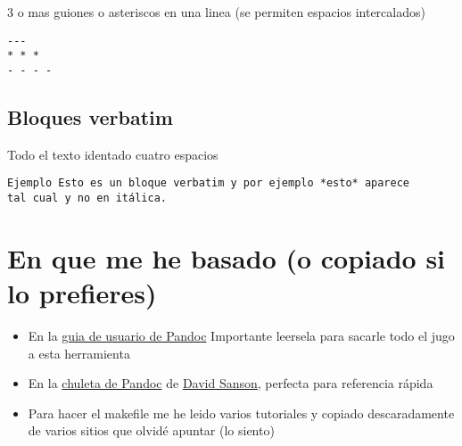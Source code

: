 \documentclass[12pt,spanish,]{article}
\providecommand{\tightlist}{%
  \setlength{\itemsep}{0pt}\setlength{\parskip}{0pt}}
\begin{document}
3 o mas guiones o asteriscos en una linea (se permiten espacios
intercalados)

\begin{verbatim}
---
* * *
- - - -
\end{verbatim}

\subsection{Bloques verbatim}\label{bloques-verbatim}

Todo el texto identado cuatro espacios

\begin{verbatim}
Ejemplo Esto es un bloque verbatim y por ejemplo *esto* aparece
tal cual y no en itálica.
\end{verbatim}

\section{En que me he basado (o copiado si lo
prefieres)}\label{en-que-me-he-basado-o-copiado-si-lo-prefieres}

\begin{itemize}
\tightlist
\item
  En la \href{http://pandoc.org/README.html}{guia de usuario de Pandoc}
  Importante leersela para sacarle todo el jugo a esta herramienta
\item
  En la
  \href{https://github.com/dsanson/Pandoc.tmbundle/blob/master/Support/doc/cheatsheet.markdown}{chuleta
  de Pandoc} de \href{https://github.com/dsanson}{David Sanson},
  perfecta para referencia rápida
\item
  Para hacer el makefile me he leido varios tutoriales y copiado
  descaradamente de varios sitios que olvidé apuntar (lo siento)
\end{itemize}
\end{document}

